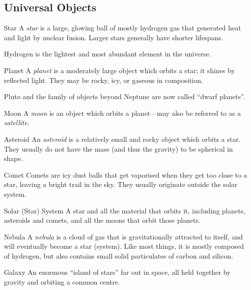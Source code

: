 \documentclass[class=article, crop=false]{standalone}
\begin{document}
  \subsection{Universal Objects}
  \begin{definition}{Star}
    A \emph{star} is a large, glowing ball of mostly hydrogen gas that generated heat and light by nuclear fusion. Larger stars generally have shorter lifespans.
  \end{definition}
  \begin{note}{}
    Hydrogen is the lightest and most abundant element in the universe.
  \end{note}
  \begin{definition}{Planet}
    A \emph{planet} is a moderately large object which orbits a star; it shines by reflected light. They may be rocky, icy, or gaseous in composition.
  \end{definition}
  Pluto and the family of objects beyond Neptune are now called ``dwarf planets''.
  \begin{definition}{Moon}
    A \emph{moon} is an object which orbits a planet---may also be referred to as a \emph{satellite}.
  \end{definition}
  \begin{definition}{Asteroid}
    An \emph{asteroid} is a relatively small and rocky object which orbits a star. They usually do not have the mass (and thus the gravity) to be spherical in shape.
  \end{definition}
  \begin{definition}{Comet}
    Comets are icy dust balls that get vaporised when they get too close to a star, leaving a bright trail in the sky. They usually originate outside the solar system.
  \end{definition}
  \begin{definition}{Solar (Star) System}
    A star and all the material that orbits it, including planets, asteroids and comets, and all the moons that orbit those planets.
  \end{definition}
  \begin{definition}{Nebula}
    A \emph{nebula} is a cloud of gas that is gravitationally attracted to itself, and will eventually become a star (system). Like most things, it is mostly composed of hydrogen, but also contains small solid particulates of carbon and silicon.
  \end{definition}
  \begin{definition}{Galaxy}
    An enormous ``island of stars'' far out in space, all held together by gravity and orbiting a common centre.
  \end{definition}
\end{document}
